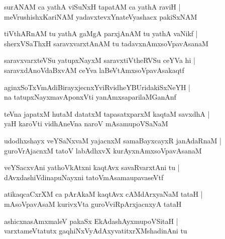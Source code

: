 \documentclass[twoside,12pt,openright]{book}
\newcounter{shloka}[chapter]
\begin{document}
\begin{shloka}%
surANAM ca yathA viSuNxH tapatAM ca yathA raviH |\\
meVrushishxKariNAM yadavxtevxYnateVyashacx pakiSxNAM 
\end{shloka}

\begin{shloka}%
tiVthARnAM tu yathA gaMgA parxjAnAM tu yathA vaNikf |\\
sherxVSaThxH saravxvarxtAnAM tu tadavxnAmxsoVpavAsanaM 
\end{shloka}

\begin{shloka}%
saravxvarxteVSu yatupxNayxM saravxtiVtheRVSu ceYVa hi |\\
saravxdAnoVdaBxvAM ceYva laBeVtAmxsoVpavAsakaqtf 
\end{shloka}

\begin{shloka}%
aginxSoTxVmAdiBirayxjecnxYviRvidheYBUridakiSxNeYH |\\
na tatupxNayxmavAponxVti yanAmxsaparilaMGanAnf 
\end{shloka}

\begin{shloka}%
teVna japatxM hutaM datatxM tapasatxparxM kaqtaM savxdhA |\\
yaH karoVti vidhAneVna naroV mAsamupoVSaNaM 
\end{shloka}

\begin{shloka}%
udodhxshayx veYSaNxvaM yajacnxM samaBayxcayxR janAdaRnaM |\\
guroVrAjacnxM tatoV labAdhxvX kurAyxnAmxsoVpavAsanaM 
\end{shloka}

\begin{shloka}%
veYSacxvAni yathoVkAtxni kaqtAvx savaRvarxtAni tu |\\
dAvxdashiVdinapuNayxni tatoVmAsamaupavaseVtf
\end{shloka}

\begin{shloka}%
atikaqcaCxrXM ca pArAkaM kaqtAvx cAMdArxyaNaM tataH |\\
mAsoVpavAsaM kurivxVta guroVviRpArxjacnxyA tataH 
\end{shloka}

\begin{shloka}%
ashicxnasAmxmaleV pakaSx EkAdashAyxmupoVSitaH |\\
varxtameVtatutx gaqhiNxVyAdAxyvatitxrXMshadinAni tu 
\end{shloka}
\end{document}
